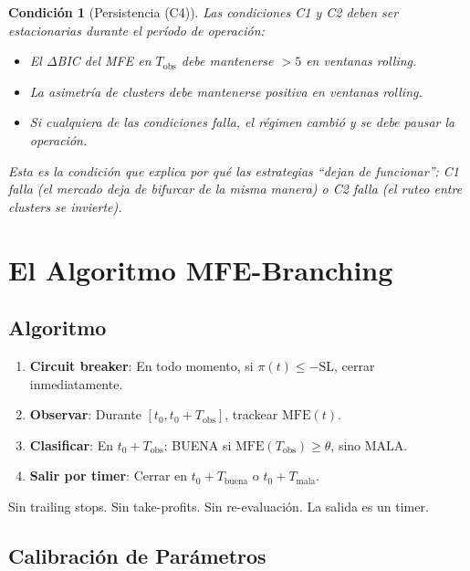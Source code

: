 \documentclass[11pt,a4paper]{article}
\newtheorem{condition}{Condición}
\begin{document}
\begin{condition}[Persistencia (C4)]
Las condiciones C1 y C2 deben ser estacionarias durante el período de operación:
\begin{itemize}
    \item El $\Delta$BIC del MFE en $T_{\text{obs}}$ debe mantenerse $> 5$ en ventanas rolling.
    \item La asimetría de clusters debe mantenerse positiva en ventanas rolling.
    \item Si cualquiera de las condiciones falla, el régimen cambió y se debe pausar la operación.
\end{itemize}
Esta es la condición que explica por qué las estrategias ``dejan de funcionar'': C1 falla (el mercado deja de bifurcar de la misma manera) o C2 falla (el ruteo entre clusters se invierte).
\end{condition}

\section{El Algoritmo MFE-Branching}

\subsection{Algoritmo}

\begin{enumerate}
    \item \textbf{Circuit breaker}: En todo momento, si $\pi(t) \leq -\text{SL}$, cerrar inmediatamente.
    \item \textbf{Observar}: Durante $[t_0, t_0 + T_{\text{obs}}]$, trackear $\text{MFE}(t)$.
    \item \textbf{Clasificar}: En $t_0 + T_{\text{obs}}$: BUENA si $\text{MFE}(T_{\text{obs}}) \geq \theta$, sino MALA.
    \item \textbf{Salir por timer}: Cerrar en $t_0 + T_{\text{buena}}$ o $t_0 + T_{\text{mala}}$.
\end{enumerate}

Sin trailing stops. Sin take-profits. Sin re-evaluación. La salida es un timer.

\subsection{Calibración de Parámetros}
\end{document}
